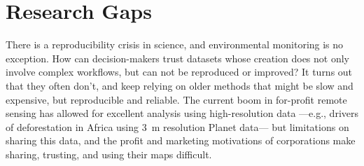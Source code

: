     \begin{table}[h]
    \centering
    \caption{Summary of Mapping Products and Data Availability}
    \label{tab:bigmaps}
    \end{table}

\section{Research Gaps}

    There is a reproducibility crisis in science, and environmental monitoring is no exception. How can decision-makers trust datasets whose creation does not only involve complex workflows, but can not be reproduced or improved? It turns out that they often don't, and keep relying on older methods that might be slow and expensive, but reproducible and reliable. The current boom in for-profit remote sensing has allowed for excellent analysis using high-resolution data ---e.g., drivers of deforestation in Africa \citep{masolele2024mapping} using 3~m resolution Planet data--- but limitations on sharing this data, and the profit and marketing motivations of corporations make sharing, trusting, and using their maps difficult.

